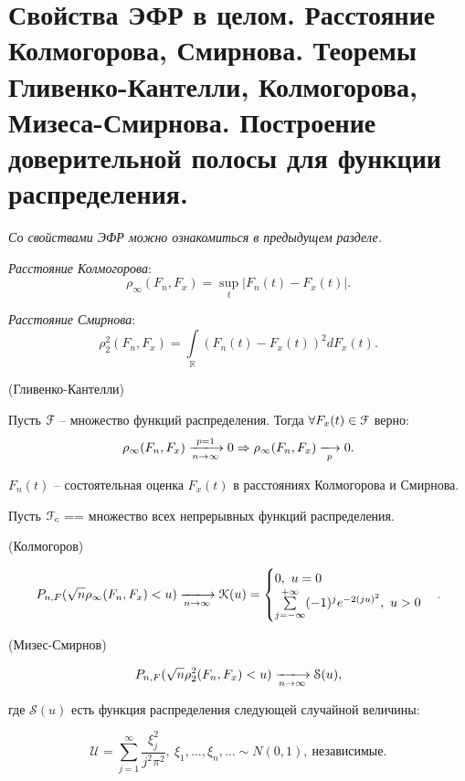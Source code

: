 \section{Свойства ЭФР в целом. Расстояние Колмогорова, Смирнова. Теоремы
Гливенко-Кантелли, Колмогорова, Мизеса-Смирнова. Построение доверительной
полосы для функции распределения.}

\textit{Со свойствами ЭФР можно ознакомиться в предыдущем разделе.}

\begin{definition}
  \textit{Расстояние Колмогорова}:
  \[
    \rho_{\infty} (F_n, F_x) = \sup_{t}|F_n(t) - F_x(t)|
  .\]
\end{definition}

\begin{definition}
  \textit{Расстояние Смирнова}:
  \[
    \rho^{2}_{2} (F_n, F_x) = \int\limits_{\mathbb{R}}(F_n(t) - F_x(t))^2
    dF_x(t)
  .\]
\end{definition}

\begin{theorem}(Гливенко-Кантелли)

  Пусть $\mathcal{F}$ -- множество функций распределения.
  Тогда $\forall F_x(t) \in \mathcal{F}$ верно:
  \[
    \rho_{\infty} (F_n, F_x) \xlongrightarrow[n \to \infty]{p=1} 0 \Rightarrow
    \rho_{\infty} (F_n, F_x) \xlongrightarrow[p]{} 0
  .\]

\end{theorem}

\begin{remark}
  $F_n(t)$ -- состоятельная оценка $F_x(t)$ в расстояниях Колмогорова и
  Смирнова.
\end{remark}

Пусть $\mathcal{F}_c$ == множество всех непрерывных функций распределения.

\begin{theorem}(Колмогоров)

  \[
    P_{n, F}(\sqrt{n} \rho_{\infty} (F_n, F_x) < u)
    \xlongrightarrow[n \to \infty]{} \mathcal{K}(u) = \begin{cases}
      0,~ u = 0\\
      \sum\limits_{j = -\infty}^{+\infty} (-1)^j e^{-2 (ju)^2},~ u > 0
    \end{cases}
  .\]

\end{theorem}

\begin{theorem}(Мизес-Смирнов)

  \[
    P_{n, F}(\sqrt{n} \rho^{2}_{2} (F_n, F_x) < u)
    \xlongrightarrow[n \to \infty]{} \mathcal{S}(u)
  ,\]

  где $\mathcal{S}(u)$ есть функция распределения следующей случайной величины:

  \[
    \mathcal{U} = \sum\limits_{j = 1}^{\infty} \frac{\xi^2_j}{j^2 \pi^2},~
    \xi_1, \ldots, \xi_n, \ldots \sim N(0, 1),~ \text{независимые}
  .\]

\end{theorem}

